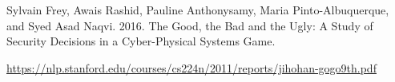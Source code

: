 \documentclass[9pt]{article}
\begin{document}
\begin{thebibliography}{99}
 Sylvain Frey, Awais Rashid, Pauline Anthonysamy, Maria Pinto-Albuquerque, and Syed Asad Naqvi. 2016.  The Good, the Bad and the Ugly: A Study of Security Decisions in a Cyber-Physical Systems Game.



 \url{https://nlp.stanford.edu/courses/cs224n/2011/reports/jihohan-gogo9th.pdf}

















\end{thebibliography}
\end{document}
